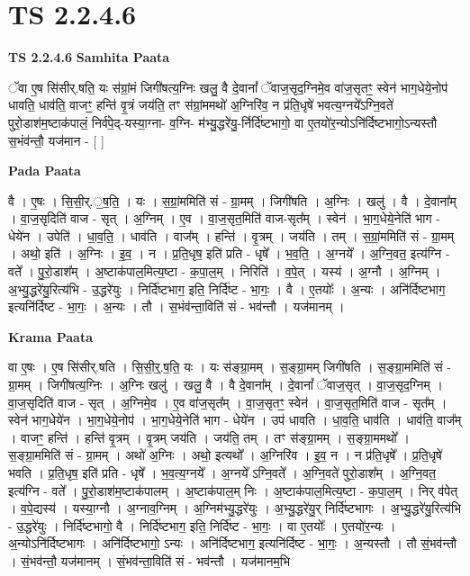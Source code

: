 \documentclass[17pt]{extarticle}
\begin{document}
\section*{ TS 2.2.4.6 }

\textbf{TS 2.2.4.6 } \newline
\textbf{Samhita Paata} \newline

ॅवा ए॒ष सि॑सीर्.षति॒ यः स॑ग्रां॒मं जिगी॑षत्य॒ग्निः खलु॒ वै दे॒वानां᳚ ॅवाज॒सृद॒ग्निमे॒व वा॑ज॒सृतꣳ॒॒ स्वेन॑ भाग॒धेये॒नोप॑ धावति॒ धाव॑ति॒ वाजꣳ॒॒ हन्ति॑ वृ॒त्रं जय॑ति॒ तꣳ स॑ग्रां॒ममथो॑ अ॒ग्निरि॑व॒ न प्र॑ति॒धृषे॑ भवत्य॒ग्नये᳚ऽग्नि॒वते॑ पुरो॒डाश॑म॒ष्टाक॑पालं॒ निर्व॑पे॒द्-यस्या॒ग्ना- व॒ग्नि- म॑भ्यु॒द्धरे॑यु॒-र्निर्दि॑ष्टभागो॒ वा ए॒तयो॑र॒न्योऽनि॑र्दिष्टभागो॒ऽन्यस्तौ स॒भंव॑न्तौ॒ यज॑मान - [  ] \newline

\textbf{Pada Paata} \newline

वै । ए॒षः । सि॒सी॒र्.॒ष॒ति॒ । यः । स॒ग्रां॒ममिति॑ सं - ग्रा॒मम् । जिगी॑षति । अ॒ग्निः । खलु॑ । वै । दे॒वाना᳚म् । वा॒ज॒सृदिति॑ वाज - सृत् । अ॒ग्निम् । ए॒व । वा॒ज॒सृत॒मिति॑ वाज-सृत᳚म् । स्वेन॑ । भा॒ग॒धेये॒नेति॑ भाग - धेये॑न । उपेति॑ । धा॒व॒ति॒ । धाव॑ति । वाज᳚म् । हन्ति॑ । वृ॒त्रम् । जय॑ति । तम् । स॒ग्रां॒ममिति॑ सं - ग्रा॒मम् । अथो॒ इति॑ । अ॒ग्निः । इ॒व॒ । न । प्र॒ति॒धृष॒ इति॑ प्रति - धृषे᳚ । भ॒व॒ति॒ । अ॒ग्नये᳚ । अ॒ग्नि॒वत॒ इत्य॑ग्नि - वते᳚ । पु॒रो॒डाश᳚म् । अ॒ष्टाक॑पाल॒मित्य॒ष्टा - क॒पा॒ल॒म् । निरिति॑ । व॒पे॒त् । यस्य॑ । अ॒ग्नौ । अ॒ग्निम् । अ॒भ्यु॒द्धरे॑यु॒रित्य॑भि - उ॒द्धरे॑युः । निर्दि॑ष्टभाग॒ इति॒ निर्दि॑ष्ट - भा॒गः॒ । वै । ए॒तयोः᳚ । अ॒न्यः । अनि॑र्दिष्टभाग॒ इत्यनि॑र्दिष्ट - भा॒गः॒ । अ॒न्यः । तौ । स॒भंव॑न्ता॒विति॑ सं - भव॑न्तौ । यज॑मानम् ।  \newline


\textbf{Krama Paata} \newline

वा ए॒षः । ए॒ष सि॑सीर्.षति । सि॒सी॒र्॒.ष॒ति॒ यः । यः स॑ङ्ग्रा॒मम् । स॒ङ्ग्रा॒मम् जिगी॑षति । स॒ङ्ग्रा॒ममिति॑ सं - ग्रा॒मम् । जिगी॑षत्य॒ग्निः । अ॒ग्निः खलु॑ । खलु॒ वै । वै दे॒वाना᳚म् । दे॒वानां᳚ ॅवाज॒सृत् । वा॒ज॒सृद॒ग्निम् । वा॒ज॒सृदिति॑ वाज - सृत् । अ॒ग्निमे॒व । ए॒व वा॑ज॒सृत᳚म् । वा॒ज॒सृतꣳ॒॒ स्वेन॑ । वा॒ज॒सृत॒मिति॑ वाज - सृत᳚म् । स्वेन॑ भाग॒धेये॑न । भा॒ग॒धेये॒नोप॑ । भा॒ग॒धेये॒नेति॑ भाग - धेये॑न । उप॑ धावति । धा॒व॒ति॒ धाव॑ति । धाव॑ति॒ वाज᳚म् । वाजꣳ॒॒ हन्ति॑ । हन्ति॑ वृ॒त्रम् । वृ॒त्रम् जय॑ति । जय॑ति॒ तम् । तꣳ स॑ङ्ग्रा॒मम् । स॒ङ्ग्रा॒ममथो᳚ । स॒ङ्ग्रा॒ममिति॑ सं - ग्रा॒मम् । अथो॑ अ॒ग्निः । अथो॒ इत्यथो᳚ । अ॒ग्निरि॑व । इ॒व॒ न । न प्र॑ति॒धृषे᳚ । प्र॒ति॒धृषे॑ भवति । प्र॒ति॒धृष॒ इति॑ प्रति - धृषे᳚ । भ॒व॒त्य॒ग्नये᳚ । अ॒ग्नये᳚ ऽग्नि॒वते᳚ । अ॒ग्नि॒वते॑ पुरो॒डाश᳚म् । अ॒ग्नि॒वत॒ इत्य॑ग्नि - वते᳚ । पु॒रो॒डाश॑म॒ष्टाक॑पालम् । अ॒ष्टाक॑पाल॒म् निः । अ॒ष्टाक॑पाल॒मित्य॒ष्टा - क॒पा॒ल॒म् । निर् व॑पेत् । व॒पे॒द्यस्य॑ । यस्या॒ग्नौ । अ॒ग्नाव॒ग्निम् । अ॒ग्निम॑भ्यु॒द्धरे॑युः । अ॒भ्यु॒द्धरे॑यु॒र् निर्दि॑ष्टभागः । अ॒भ्यु॒द्धरे॑यु॒रित्य॑भि - उ॒द्धरे॑युः । निर्दि॑ष्टभागो॒ वै । निर्दि॑ष्टभाग॒ इति॒ निर्दि॑ष्ट - भा॒गः॒ । वा ए॒तयोः᳚ । ए॒तयो॑र॒न्यः । अ॒न्योऽनि॑र्दिष्टभागः । अनि॑र्दिष्टभागो॒ ऽन्यः । अनि॑र्दिष्टभाग॒ इत्यनि॑र्दिष्ट - भा॒गः॒ । अ॒न्यस्तौ । तौ सं॒भव॑न्तौ । सं॒भव॑न्तौ॒ यज॑मानम् । सं॒भव॑न्ता॒विति॑ सं - भव॑न्तौ । यज॑मानम॒भि \newline
\end{document}
